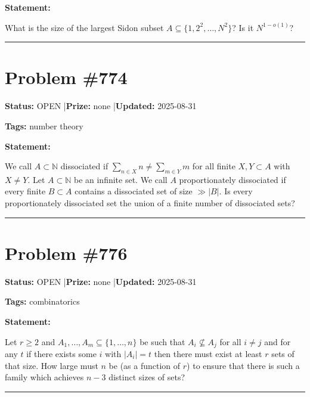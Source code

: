 \documentclass{article}
\begin{document}
\medskip

\noindent\textbf{Statement:}

What is the size of the largest Sidon subset $A\subseteq\{1,2^2,\ldots,N^2\}$? Is it $N^{1-o(1)}$?

\noindent\rule{\linewidth}{0.4pt}


\section{Problem \#774}
\label{prob:774}

\noindent\textbf{Status:} OPEN \quad|\quad \textbf{Prize:} none \quad|\quad \textbf{Updated:} 2025-08-31

\noindent\textbf{Tags:} number theory

\medskip

\noindent\textbf{Statement:}

We call $A\subset \mathbb{N}$ dissociated if $\sum_{n\in X}n\neq \sum_{m\in Y}m$ for all finite $X,Y\subset A$ with $X\neq Y$. Let $A\subset \mathbb{N}$ be an infinite set. We call $A$ proportionately dissociated if every finite $B\subset A$ contains a dissociated set of size $\gg \lvert B\rvert$. Is every proportionately dissociated set the union of a finite number of dissociated sets?

\noindent\rule{\linewidth}{0.4pt}


\section{Problem \#776}
\label{prob:776}

\noindent\textbf{Status:} OPEN \quad|\quad \textbf{Prize:} none \quad|\quad \textbf{Updated:} 2025-08-31

\noindent\textbf{Tags:} combinatorics

\medskip

\noindent\textbf{Statement:}

Let $r\geq 2$ and $A_1,\ldots,A_m\subseteq \{1,\ldots,n\}$ be such that $A_i\not\subseteq A_j$ for all $i\neq j$ and for any $t$ if there exists some $i$ with $\lvert A_i\rvert=t$ then there must exist at least $r$ sets of that size. How large must $n$ be (as a function of $r$) to ensure that there is such a family which achieves $n-3$ distinct sizes of sets?

\noindent\rule{\linewidth}{0.4pt}
\end{document}
